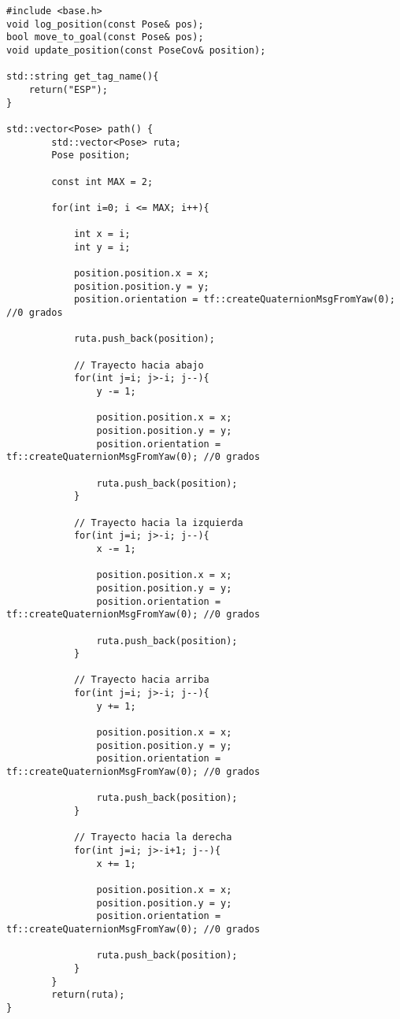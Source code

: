 \begin{lstlisting}
#include <base.h>
void log_position(const Pose& pos);
bool move_to_goal(const Pose& pos);
void update_position(const PoseCov& position);

std::string get_tag_name(){
    return("ESP");
}

std::vector<Pose> path() {
        std::vector<Pose> ruta;
        Pose position;

        const int MAX = 2;

        for(int i=0; i <= MAX; i++){

            int x = i;
            int y = i;

            position.position.x = x;
            position.position.y = y;
            position.orientation = tf::createQuaternionMsgFromYaw(0); //0 grados

            ruta.push_back(position);

            // Trayecto hacia abajo
            for(int j=i; j>-i; j--){
                y -= 1;

                position.position.x = x;
                position.position.y = y;
                position.orientation = tf::createQuaternionMsgFromYaw(0); //0 grados

                ruta.push_back(position);
            }

            // Trayecto hacia la izquierda
            for(int j=i; j>-i; j--){
                x -= 1;

                position.position.x = x;
                position.position.y = y;
                position.orientation = tf::createQuaternionMsgFromYaw(0); //0 grados

                ruta.push_back(position);
            }

            // Trayecto hacia arriba
            for(int j=i; j>-i; j--){
                y += 1;

                position.position.x = x;
                position.position.y = y;
                position.orientation = tf::createQuaternionMsgFromYaw(0); //0 grados

                ruta.push_back(position);
            }

            // Trayecto hacia la derecha
            for(int j=i; j>-i+1; j--){
                x += 1;

                position.position.x = x;
                position.position.y = y;
                position.orientation = tf::createQuaternionMsgFromYaw(0); //0 grados

                ruta.push_back(position);
            }
        }
        return(ruta);
}
\end{lstlisting}
\vspace*{0.5cm}

